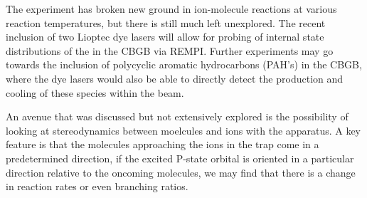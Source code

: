 The experiment has broken new ground in ion-molecule reactions at various reaction temperatures, but there is still much left unexplored. The recent inclusion of two Lioptec dye lasers will allow for probing of internal state distributions of the  in the CBGB via REMPI. Further experiments may go towards the inclusion of polycyclic aromatic hydrocarbons (PAH's) in the CBGB, where the dye lasers would also be able to directly detect the production and cooling of these species within the beam.

An avenue that was discussed but not extensively explored is the possibility of looking at stereodynamics between moelcules and ions with the apparatus. A key feature is that the molecules approaching the ions in the trap come in a predetermined direction, if the excited  P-state orbital is oriented in a particular direction relative to the oncoming molecules, we may find that there is a change in reaction rates or even branching ratios.